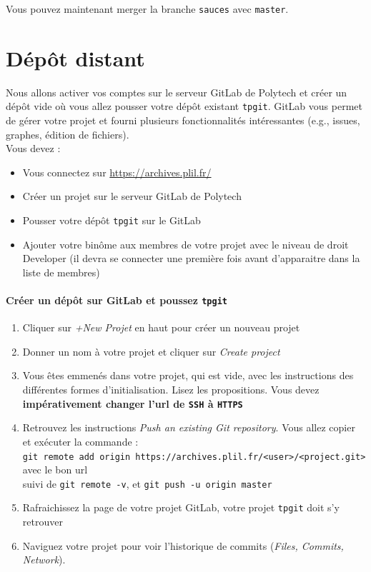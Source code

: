 \documentclass[final, a4paper, openbib, ]{article}
\begin{document}
Vous pouvez maintenant merger la branche \texttt{sauces} avec \texttt{master}.

\section{Dépôt distant}

Nous allons activer vos comptes sur le serveur GitLab de Polytech et créer un dépôt vide où vous allez pousser votre dépôt existant \texttt{tpgit}.
GitLab vous permet de gérer votre projet et fourni plusieurs fonctionnalités intéressantes (e.g., issues, graphes, édition de fichiers).\\

Vous devez :
\begin{itemize}
\item Vous connectez sur \url{https://archives.plil.fr/}
\item Créer un projet sur le serveur GitLab de Polytech
\item Pousser votre dépôt \texttt{tpgit} sur le GitLab
\item Ajouter votre binôme aux membres de votre projet avec le niveau de droit Developer (il devra se connecter une première fois avant d'apparaitre dans la liste de membres)
\end{itemize}

\paragraph{Créer un dépôt sur GitLab et poussez \texttt{tpgit}}
\begin{enumerate}
\item Cliquer sur \textit{+New Projet} en haut pour créer un nouveau projet
\item Donner un nom à votre projet et cliquer sur \textit{Create project}
\item Vous êtes emmenés dans votre projet, qui est vide, avec les instructions des différentes formes d'initialisation.
Lisez les propositions.
Vous devez \textbf{impérativement changer l'url de \texttt{SSH} à \texttt{HTTPS}}
\item Retrouvez les instructions \textit{Push an existing Git repository}. Vous allez copier et exécuter la commande :\\ \texttt{git remote add origin https://archives.plil.fr/<user>/<project.git>} avec le bon url\\ suivi de \texttt{git remote -v}, et \texttt{git push -u origin master}
\item Rafraichissez la page de votre projet GitLab, votre projet \texttt{tpgit} doit s'y retrouver
\item Naviguez votre projet pour voir l'historique de commits (\textit{Files, Commits, Network}).
\end{enumerate}
\end{document}
